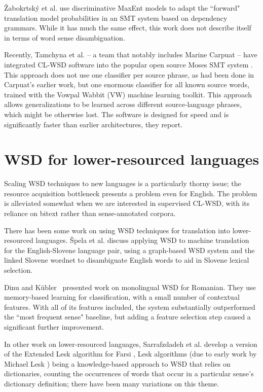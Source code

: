 Žabokrtsk\'{y} et al. \cite{vzabokrtsky-popel-marevcek:2010:WMT} use
discriminative MaxEnt models to adapt the ``forward" translation model
probabilities in an SMT system based on dependency grammars. While it has much
the same effect, this work does not describe itself in terms of word sense
disambiguation.

Recently, Tamchyna et al. -- a team that notably includes Marine Carpuat --
have integrated CL-WSD software into the popular open source Moses SMT system
\cite{tamchyna2014integrating}.
This approach does not use one classifier per source phrase, as had been done
in Carpuat's earlier work, but one enormous classifier for all known source
words, trained with the Vowpal Wabbit (VW) machine learning toolkit. This
approach allows generalizations to be learned across different source-language
phrases, which might be otherwise lost. The software is designed for speed and
is significantly faster than earlier architectures, they report.

\section{WSD for lower-resourced languages}
Scaling WSD techniques to new languages is a particularly thorny issue; the
resource acquisition bottleneck presents a problem even for English.
The problem is alleviated somewhat when we are interested in supervised CL-WSD,
with its reliance on bitext rather than sense-annotated corpora.

There has been some work on using WSD techniques for translation into
lower-resourced languages.  \v{S}pela et al.
\cite{vintar-fivser-vrvsvcaj:2012:ESIRMT-HyTra2012} discuss applying WSD to
machine translation for the English-Slovene language pair, using a graph-based
WSD system and the linked Slovene wordnet to disambiguate English words to aid
in Slovene lexical selection.

Dinu and Kübler~\cite{Dinu07} presented work on monolingual WSD for Romanian.
They use memory-based learning for classification, with a small number of
contextual features. With all of its features included, the system
substantially outperformed the ``most frequent sense" baseline, but adding a
feature selection step caused a significant further improvement.

In other work on lower-resourced languages, Sarrafzdadeh et al. develop
a version of the Extended Lesk algorithm for Farsi \cite{sarrafzdadeh},
Lesk algorithms (due to early work by Michael Lesk \cite{lesk}) being a
knowledge-based approach to WSD that relies on dictionaries, counting the
occurrences of words that occur in a particular sense's dictionary definition;
there have been many variations on this theme.

